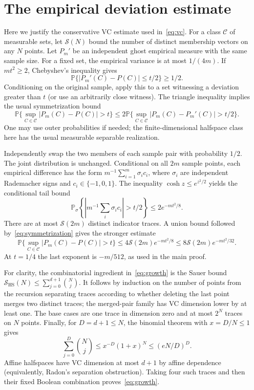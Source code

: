 \documentclass[11pt,letterpaper]{article}
\numberwithin{equation}{section}
\theoremstyle{remark}
\newcommand{\Prb}{\mathbb P}
\newcommand{\1}{\mathbf 1}
\newcommand{\abs}[1]{\left\lvert#1\right\rvert}
\begin{document}
\appendix
\section{The empirical deviation estimate}\label{app:vc}

Here we justify the conservative VC estimate used in~\eqref{eq:vc}. For a class $\mathcal C$ of measurable sets, let $\mathcal S(N)$ bound the number of distinct membership vectors on any $N$ points. Let $P_m'$ be an independent ghost empirical measure with the same sample size. For a fixed set, the empirical variance is at most $1/(4m)$. If $mt^2\ge2$, Chebyshev's inequality gives
\[
 \Prb\{\abs{P_m'(C)-P(C)}\le t/2\}\ge1/2.
\]
Conditioning on the original sample, apply this to a set witnessing a deviation greater than $t$ (or use an arbitrarily close witness). The triangle inequality implies the usual symmetrization bound
\begin{equation}\label{eq:symmetrization}
 \Prb\{\sup_{C\in\mathcal C}\abs{P_m(C)-P(C)}>t\}
 \le2\Prb\{\sup_{C\in\mathcal C}\abs{P_m(C)-P_m'(C)}>t/2\}.
\end{equation}
One may use outer probabilities if needed; the finite-dimensional halfspace class here has the usual measurable separable realization.

Independently swap the two members of each sample pair with probability $1/2$. The joint distribution is unchanged. Conditional on all $2m$ sample points, each empirical difference has the form
$m^{-1}\sum_{i=1}^m\sigma_i c_i$, where $\sigma_i$ are independent Rademacher signs and $c_i\in\{-1,0,1\}$. The inequality $\cosh z\le e^{z^2/2}$ yields the conditional tail bound
\[
 \Prb_\sigma\left\{\abs{m^{-1}\sum_i\sigma_ic_i}>t/2\right\}
 \le2e^{-mt^2/8}.
\]
There are at most $\mathcal S(2m)$ distinct indicator traces. A union bound followed by~\eqref{eq:symmetrization} gives the stronger estimate
\[
 \Prb\{\sup_{C\in\mathcal C}\abs{P_m(C)-P(C)}>t\}
 \le4\mathcal S(2m)e^{-mt^2/8}
 \le8\mathcal S(2m)e^{-mt^2/32}.
\]
At $t=1/4$ the last exponent is $-m/512$, as used in the main proof.

For clarity, the combinatorial ingredient in~\eqref{eq:growth} is the Sauer bound
$\mathcal S_{\mathrm{HS}}(N)\le\sum_{j=0}^{d+1}\binom Nj$.
It follows by induction on the number of points from the recursion separating traces according to whether deleting the last point merges two distinct traces; the merged-pair family has VC dimension lower by at least one. The base cases are one trace in dimension zero and at most $2^N$ traces on $N$ points. Finally, for $D=d+1\le N$, the binomial theorem with $x=D/N\le1$ gives
\[
 \sum_{j=0}^D\binom Nj
 \le x^{-D}(1+x)^N
 \le(eN/D)^D.
\]
Affine halfspaces have VC dimension at most $d+1$ by affine dependence (equivalently, Radon's separation obstruction). Taking four such traces and then their fixed Boolean combination proves~\eqref{eq:growth}.
\end{document}
